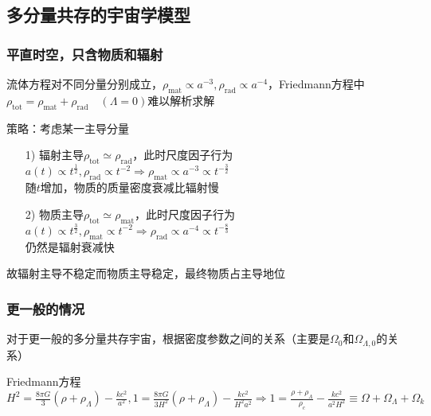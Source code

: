 \subsection{多分量共存的宇宙学模型}
\subsubsection{平直时空，只含物质和辐射}
\par 
流体方程对不同分量分别成立，$\rho_{\text{mat}} \propto a^{-3}, \rho_{\text{rad}} \propto a^{-4}$，Friedmann方程中$\rho_{\text{tot}} = \rho_{\text{mat}} + \rho_{\text{rad}} \quad (\Lambda = 0)$难以解析求解
\par 
策略：考虑某一主导分量
\begin{itemize}
	\item[1)] 辐射主导$\rho_{\text{tot}} \simeq \rho_{\text{rad}}$，此时尺度因子行为$a(t) \propto t^{\frac{1}{2}}, \rho_{\text{rad}} \propto t^{-2} \Rightarrow \rho_{\text{mat}} \propto a^{-3} \propto t^{-\frac{3}{2}}$ \\
	随$t$增加，物质的质量密度衰减比辐射慢
	
	\item[2)] 物质主导$\rho_{\text{tot}} \simeq \rho_{\text{mat}}$，此时尺度因子行为$a(t) \propto t^{\frac{3}{2}}, \rho_{\text{mat}} \propto t^{-2} \Rightarrow \rho_{\text{rad}} \propto a^{-4} \propto t^{-\frac{8}{3}}$ \\
	仍然是辐射衰减快
\end{itemize}
\par 
故辐射主导不稳定而物质主导稳定，最终物质占主导地位

\subsubsection{更一般的情况}
\par
对于更一般的多分量共存宇宙，根据密度参数之间的关系（主要是$\Omega_0$和$\Omega_{\Lambda, 0}$的关系）
\par 
Friedmann方程$H^2 = \frac{8 \pi G}{3} (\rho + \rho_{\Lambda}) - \frac{k c^2}{a^2}, 1 = \frac{8 \pi G}{3 H^2} (\rho + \rho_{\Lambda}) - \frac{k c^2}{H^2 a^2} \Rightarrow 1 = \frac{\rho + \rho_{\Lambda}}{\rho_c} - \frac{k c^2}{a^2 H^2} \equiv \Omega + \Omega_{\Lambda} + \Omega_{k}$

